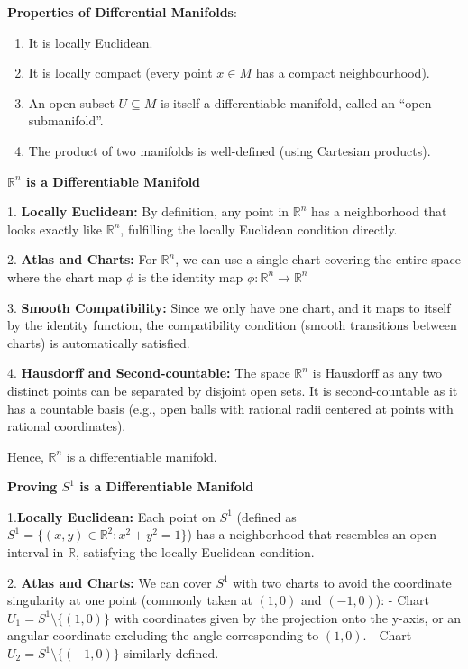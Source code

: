 \documentclass{article}
\begin{document}
\begin{theorem}
\textbf{Properties of Differential Manifolds}:
\begin{enumerate}
    \item It is locally Euclidean.
    \item It is locally compact (every point \( x \in M \) has a compact neighbourhood).
    \item An open subset \( U \subseteq M \) is itself a differentiable manifold, called an ``open submanifold''.
    \item The product of two manifolds is well-defined (using Cartesian products).
\end{enumerate}
\end{theorem}

\textbf{\(\mathbb{R}^n\) is a Differentiable Manifold}

1. \textbf{Locally Euclidean:} By definition, any point in \(\mathbb{R}^n\) has a neighborhood that looks exactly like \(\mathbb{R}^n\), fulfilling the locally Euclidean condition directly.

2. \textbf{Atlas and Charts:} For \(\mathbb{R}^n\), we can use a single chart covering the entire space where the chart map \(\phi\) is the identity map \(\phi: \mathbb{R}^n \rightarrow \mathbb{R}^n\)

3. \textbf{Smooth Compatibility:} Since we only have one chart, and it maps to itself by the identity function, the compatibility condition (smooth transitions between charts) is automatically satisfied.

4. \textbf{Hausdorff and Second-countable:} The space \(\mathbb{R}^n\) is Hausdorff as any two distinct points can be separated by disjoint open sets. It is second-countable as it has a countable basis (e.g., open balls with rational radii centered at points with rational coordinates).

Hence, \(\mathbb{R}^n\) is a differentiable manifold.

\textbf{Proving \(S^1\) is a Differentiable Manifold}

1.\textbf{Locally Euclidean:}  Each point on \(S^1\) (defined as \(S^1 = \{(x, y) \in \mathbb{R}^2 : x^2 + y^2 = 1\}\)) has a neighborhood that resembles an open interval in \(\mathbb{R}\), satisfying the locally Euclidean condition.

2. \textbf{Atlas and Charts:} We can cover \(S^1\) with two charts to avoid the coordinate singularity at one point (commonly taken at \( (1,0) \) and \((-1,0)\)):
   - Chart \(U_1 = S^1 \setminus \{(1,0)\}\) with coordinates given by the projection onto the y-axis, or an angular coordinate excluding the angle corresponding to \((1,0)\).
   - Chart \(U_2 = S^1 \setminus \{(-1,0)\}\) similarly defined.
\end{document}
